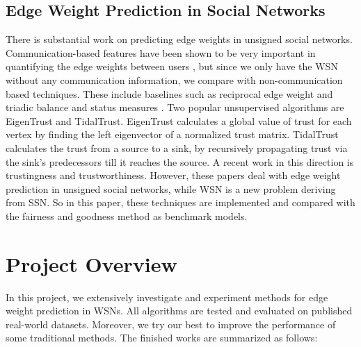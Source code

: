 \documentclass{article}
\begin{document}
\subsection{Edge Weight Prediction in Social Networks}
There is substantial work on predicting edge weights in unsigned social 
networks. Communication-based features have been shown to be 
very important in quantifying the edge weights between 
users\cite{Gilbert:2012:PTS:2145204.2145360}\cite{Gilbert:2009:PTS:1518701.1518736}
\cite{Xiang:2010:MRS:1772690.1772790}\cite{Kahanda2009}, but 
since we only have the WSN without any communication information, 
we compare with non-communication based techniques. These 
include baselines such as reciprocal edge weight\cite{Gilbert:2012:PTS:2145204.2145360} 
and triadic balance and status measures\cite{Gilbert:2009:PTS:1518701.1518736}
\cite{Sintos:2014:UST:2623330.2623664}. Two popular unsupervised 
algorithms are EigenTrust\cite{Kamvar:2003:EAR:775152.775242} 
and TidalTrust\cite{Katz2006}. EigenTrust calculates a global 
value of trust for each vertex by finding the left eigenvector 
of a normalized trust matrix. TidalTrust calculates the trust 
from a source to a sink, by recursively propagating trust via 
the sink’s predecessors till it reaches the source. A 
recent work in this direction is trustingness and 
trustworthiness\cite{Roy2016}. However, these papers deal with 
edge weight prediction in unsigned social networks, while WSN 
is a new problem deriving from SSN. So in this paper, these 
techniques are implemented and compared with the fairness and goodness 
method as benchmark models.

\section{Project Overview}
\label{sec3}
In this project, we extensively investigate and experiment methods for edge weight prediction in WSNs. All algorithms are tested and evaluated on published real-world datasets. Moreover, we try our best to improve the performance of some traditional methods. The finished works are summarized as follows:
\end{document}
